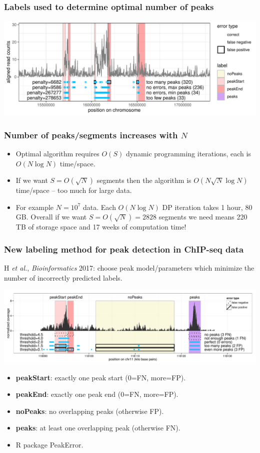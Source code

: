 \documentclass{beamer}
\begin{document}
\begin{frame}
  \frametitle{Labels used to determine optimal number of peaks}
  \includegraphics[width=\textwidth]{jss-figure-label-error}
\end{frame}

\begin{frame}
  \frametitle{Number of peaks/segments increases with $N$ }
  
  \vskip -0.4cm
  \begin{itemize} 
  \item %
    Optimal algorithm requires $O(S)$ dynamic programming iterations,
    each is $O(N\log N)$ time/space.
  \item If we want $S=O(\sqrt{N})$ segments then the algorithm is
    $O(N \sqrt N \log N)$ time/space -- too much for large data.
  \item For example $N=10^7$ data. Each $O(N\log N)$ DP iteration
    takes 1 hour, 80 GB. Overall if we want $S=O(\sqrt N) = 2828$
    segments we need means 220 TB of storage space and 17 weeks of
    computation time!
  \end{itemize}

  
\end{frame}


\begin{frame}
  \frametitle{New labeling method for peak detection in ChIP-seq data}

  H {\it et al.}, {\it Bioinformatics} 2017: choose peak model/parameters
  which minimize the number of incorrectly predicted labels.

  \includegraphics[width=\textwidth]{figure-PeakError.pdf}
  \begin{itemize}
  \item \textbf{peakStart}: exactly one peak start (0=FN, more=FP).
  \item \textbf{peakEnd}: exactly one peak end (0=FN, more=FP).
  \item \textbf{noPeaks}: no overlapping peaks (otherwise FP).
  \item \textbf{peaks}: at least one overlapping peak (otherwise FN).
  \item R package PeakError.
  \end{itemize}
\end{frame}
\end{document}
